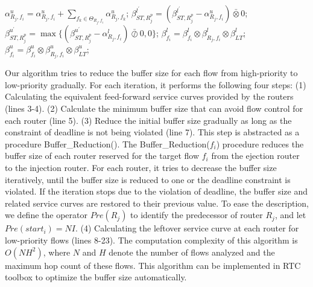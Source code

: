 \documentclass[preprint]{elsarticle}
\begin{document}
\begin{algorithm}[!h]
\begin{algorithmic}[1]
                    \State $\alpha^u_{R_j,f_i}=\alpha^u_{R_j,f_i}+\sum_{f_k\in\Theta_{R_j,f_i}}\alpha^u_{R_j,f_k}$;
                    \State $\beta^{l^\prime}_{ST,R_j^{p}}=(\beta^{l^\prime}_{ST,R_j^{p}}-\alpha^u_{R_j,f_i})\bar{\otimes}0$;
                    \State $\beta^{u^\prime}_{ST,R_j^{p}}=\max\{(\beta^{u^\prime}_{ST,R_j^{p}}-\alpha^l_{R_j,f_i})\bar{\oslash}0,0\}$;
                \EndIf
            \EndIf
            \State $\beta_{f_i}^l=\beta_{f_i}^l\otimes\beta^l_{R_j,f_i}\otimes\beta^l_{LT}$; $\beta_{f_i}^u=\beta_{f_i}^u\otimes\beta^u_{R_j,f_i}\otimes\beta^u_{LT}$;
        \EndFor
    \EndFor
\end{algorithmic}
\end{algorithm}

Our algorithm tries to reduce the buffer size for each flow from high-priority to low-priority gradually. For each iteration, it performs the following four steps: (1) Calculating the equivalent feed-forward service curves provided by the routers (lines 3-4). (2) Calculate the minimum buffer size that can avoid flow control for each router (line 5). (3) Reduce the initial buffer size gradually as long as the constraint of deadline is not being violated (line 7). This step is abstracted as a procedure Buffer\_Reduction(). The Buffer\_Reduction($f_i$) procedure reduces the buffer size of each router reserved for the target flow $f_i$ from the ejection router to the injection router. For each router, it tries to decrease the buffer size iteratively, until the buffer size is reduced to one or the deadline constraint is violated. If the iteration stops due to the violation of deadline, the buffer size and related service curves are restored to their previous value. To ease the description, we define the operator $Pre(R_j)$ to identify the predecessor of router $R_j$, and let $Pre(start_i)=NI$. (4) Calculating the leftover service curve at each router for low-priority flows (lines 8-23). The computation complexity of this algorithm is $O(NH^2)$, where $N$ and $H$ denote the number of flows analyzed and the maximum hop count of these flows. This algorithm can be implemented in RTC toolbox \cite{rtc} to optimize the buffer size automatically.
\end{document}
